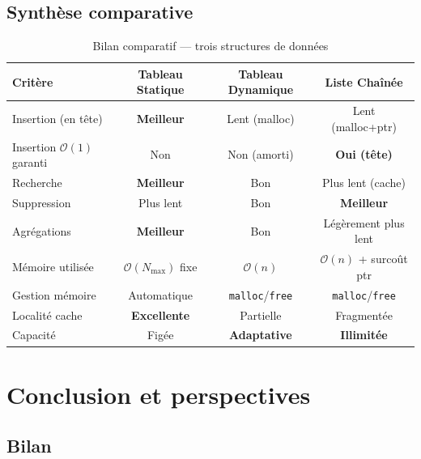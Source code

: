 \documentclass[12pt,a4paper]{report}
\begin{document}
\section{Synthèse comparative}

\begin{table}[H]
\centering
\caption{Bilan comparatif — trois structures de données}
\label{tab:bilan}
\renewcommand{\arraystretch}{1.4}
\begin{tabular}{lccc}
\toprule
\textbf{Critère} & \textbf{Tableau Statique} & \textbf{Tableau Dynamique} & \textbf{Liste Chaînée} \\
\midrule
Insertion (en tête)   & \textcolor{vertSD}{\textbf{Meilleur}} & \textcolor{rougeSD}{Lent (malloc)} & \textcolor{rougeSD}{Lent (malloc+ptr)} \\
Insertion $\mathcal{O}(1)$ garanti & Non & Non (amorti) & \textcolor{vertSD}{\textbf{Oui (tête)}} \\
Recherche             & \textcolor{vertSD}{\textbf{Meilleur}} & Bon & \textcolor{rougeSD}{Plus lent (cache)} \\
Suppression           & \textcolor{rougeSD}{Plus lent} & Bon & \textcolor{vertSD}{\textbf{Meilleur}} \\
Agrégations           & \textcolor{vertSD}{\textbf{Meilleur}} & Bon & \textcolor{rougeSD}{Légèrement plus lent} \\
Mémoire utilisée      & $\mathcal{O}(N_{\max})$ fixe & $\mathcal{O}(n)$ & $\mathcal{O}(n)$ + surcoût ptr \\
Gestion mémoire       & Automatique & \texttt{malloc}/\texttt{free} & \texttt{malloc}/\texttt{free} \\
Localité cache        & \textcolor{vertSD}{\textbf{Excellente}} & Partielle & \textcolor{rougeSD}{Fragmentée} \\
Capacité              & Figée & \textcolor{vertSD}{\textbf{Adaptative}} & \textcolor{vertSD}{\textbf{Illimitée}} \\
\bottomrule
\end{tabular}
\end{table}

\chapter{Conclusion et perspectives}
\label{chap:conclusion}

\section{Bilan}
\end{document}
